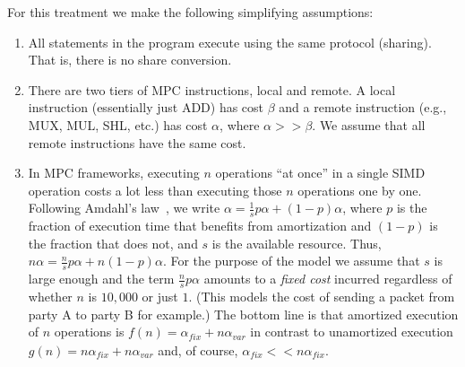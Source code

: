\documentclass[sigconf, screen, natbib=false, dvipsnames, table]{acmart}
\theoremstyle{definition}
\begin{document}
For this treatment we make the following simplifying assumptions:

\begin{enumerate}
\item All statements in the program execute using the same protocol (sharing). That is, there is no share conversion. 
\item There are two tiers of MPC instructions, local and remote. A local instruction (essentially just ADD) has cost $\beta$ 
and a remote instruction (e.g., MUX, MUL, SHL, etc.) has cost $\alpha$, where $\alpha >> \beta$. We assume that all remote 
instructions have the same cost.
\item  In MPC frameworks, executing $n$ operations ``at once'' in a single SIMD operation costs a lot less than executing those $n$ operations one by one.
Following Amdahl's law~, we write $\alpha = \frac{1}{s}p\alpha + (1-p)\alpha$, where $p$ is the fraction of execution time that benefits from amortization and $(1-p)$ 
is the fraction that does not, and $s$ is the available resource. Thus, $n\alpha = \frac{n}{s}p\alpha + n(1-p)\alpha$. 
For the purpose of the model we assume that $s$ is large enough and the term $\frac{n}{s}p\alpha$ amounts to a \emph{fixed cost} incurred regardless of
whether $n$ is $10,000$ or just $1$. (This models the cost of sending a packet from party A to party B for example.) The bottom line is that amortized execution 
of $n$ operations is $f(n) = \alpha_\mathit{fix} + n\alpha_{var}$ in contrast to unamortized execution $g(n) = n\alpha_\mathit{fix} + n\alpha_{var}$ and, of course,
$\alpha_\mathit{fix} << n\alpha_\mathit{fix}$.

\end{enumerate}
\end{document}
